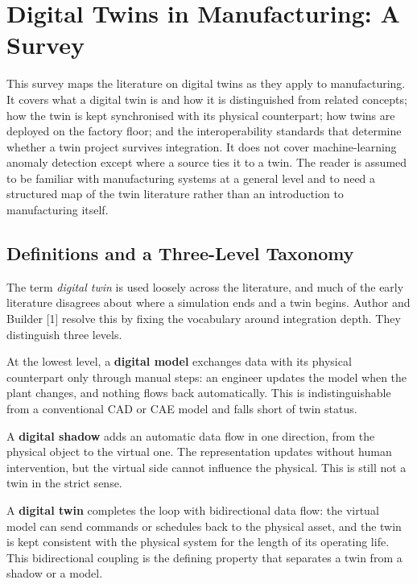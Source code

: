 \documentclass[
  12pt,
  a4paper,
]{article}
\author{}
\date{}
\begin{document}
\hypertarget{digital-twins-in-manufacturing-a-survey}{%
\section{Digital Twins in Manufacturing: A
Survey}\label{digital-twins-in-manufacturing-a-survey}}

This survey maps the literature on digital twins as they apply to
manufacturing. It covers what a digital twin is and how it is
distinguished from related concepts; how the twin is kept synchronised
with its physical counterpart; how twins are deployed on the factory
floor; and the interoperability standards that determine whether a twin
project survives integration. It does not cover machine-learning anomaly
detection except where a source ties it to a twin. The reader is assumed
to be familiar with manufacturing systems at a general level and to need
a structured map of the twin literature rather than an introduction to
manufacturing itself.

\hypertarget{definitions-and-a-three-level-taxonomy}{%
\subsection{Definitions and a Three-Level
Taxonomy}\label{definitions-and-a-three-level-taxonomy}}

The term \emph{digital twin} is used loosely across the literature, and
much of the early literature disagrees about where a simulation ends and
a twin begins. Author and Builder {[}1{]} resolve this by fixing the
vocabulary around integration depth. They distinguish three levels.

At the lowest level, a \textbf{digital model} exchanges data with its
physical counterpart only through manual steps: an engineer updates the
model when the plant changes, and nothing flows back automatically. This
is indistinguishable from a conventional CAD or CAE model and falls
short of twin status.

A \textbf{digital shadow} adds an automatic data flow in one direction,
from the physical object to the virtual one. The representation updates
without human intervention, but the virtual side cannot influence the
physical. This is still not a twin in the strict sense.

A \textbf{digital twin} completes the loop with bidirectional data flow:
the virtual model can send commands or schedules back to the physical
asset, and the twin is kept consistent with the physical system for the
length of its operating life. This bidirectional coupling is the
defining property that separates a twin from a shadow or a model.
\end{document}
